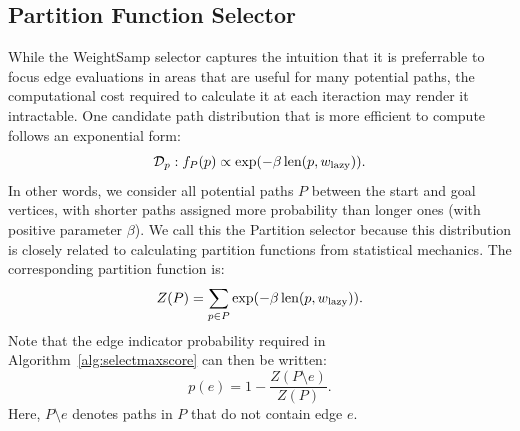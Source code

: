 \subsection{Partition Function Selector}

While the WeightSamp selector captures the intuition that it is
preferrable to focus edge evaluations in areas that are useful for
many potential paths,
the computational cost required to calculate it at each iteraction
may render it intractable.
One candidate path distribution that is more efficient to compute
follows an exponential form:
\begin{equation}
   \mathcal{D}_p : f_P(p) \propto
   \exp( - \beta \, \mbox{len}(p, w_{\mbox{\scriptsize lazy}}) ).
\end{equation}
In other words,
we consider all potential paths $P$
between the start and goal vertices,
with shorter paths assigned more probability than longer ones
(with positive parameter $\beta$).
We call this the Partition selector
because this distribution is closely related to calculating
partition functions from statistical mechanics.
The corresponding partition function is:
\begin{equation}
   Z(P) = \sum_{p \in P}
      \exp( - \beta \, \mbox{len}(p, w_{\mbox{\scriptsize lazy}}) ).
   \label{eqn:partitionfn}
\end{equation}
Note that the edge indicator probability
required in Algorithm~\ref{alg:selectmaxscore}
can then be written:
\begin{equation}
   p(e) = 1 - \frac{Z(P \setminus e)}{Z(P)}.
   \label{eqn:edge-ind-prob}
\end{equation}
Here, $P \setminus e$ denotes paths in $P$ that do not
contain edge $e$.


